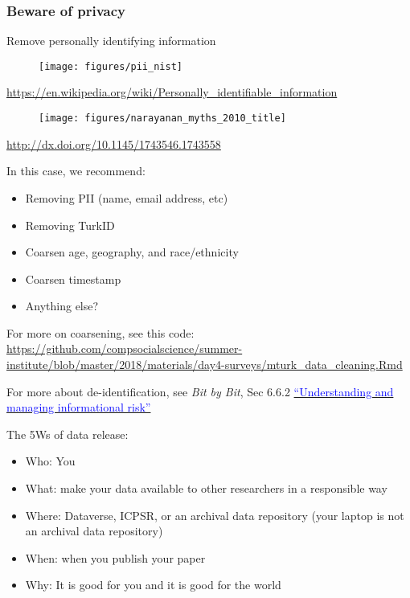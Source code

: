 \documentclass[aspectratio=169]{beamer}
\begin{document}
\begin{frame}
\frametitle{Beware of privacy}
\pause

Remove personally identifying information 

\begin{figure}
  \centering
  \texttt{[image: figures/pii\_nist]}
\end{figure}

\vfill
\url{https://en.wikipedia.org/wiki/Personally_identifiable_information}

\end{frame}
\begin{frame}

\begin{figure}
  \centering
  \texttt{[image: figures/narayanan\_myths\_2010\_title]}
\end{figure}

\vfill
\url{http://dx.doi.org/10.1145/1743546.1743558}
\end{frame}
\begin{frame}

In this case, we recommend:
\begin{itemize}
\item Removing PII (name, email address, etc)
\item Removing TurkID
\item Coarsen age, geography, and race/ethnicity
\item Coarsen timestamp
\item Anything else?
\end{itemize}

For more on coarsening, see this code:\\
\url{https://github.com/compsocialscience/summer-institute/blob/master/2018/materials/day4-surveys/mturk_data_cleaning.Rmd}

\end{frame}
\begin{frame}

For more about de-identification, see \textit{Bit by Bit}, Sec 6.6.2 \href{https://www.bitbybitbook.com/en/1st-ed/ethics/dilemmas/info-risk/}{\textcolor{blue}{``Understanding and managing informational risk''}}

\end{frame}
\begin{frame}

The 5Ws of data release: \pause
\begin{itemize}
\item Who: You
\pause
\item What: make your data available to other researchers in a responsible way
\pause
\item Where: Dataverse, ICPSR, or an archival data repository \pause (your laptop is not an archival data repository)
\pause 
\item When:  when you publish your paper
\pause
\item Why: It is good for you and it is good for the world
\end{itemize}

\end{frame}
\end{document}
